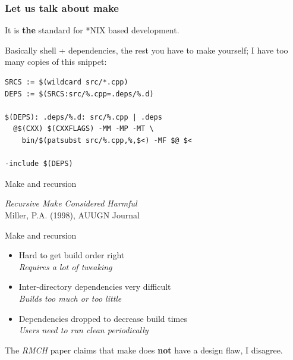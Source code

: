\documentclass[11pt]{beamer}
\begin{document}
\begin{frame}[fragile]
  \frametitle{Let us talk about make}

  It is \alert{\textbf{the}} standard for *NIX based development.

  \vspace{3mm}

  Basically shell + dependencies, the rest you have to make yourself;
  I have too many copies of this snippet:

  \vspace{5mm}

  \begin{lstlisting}[language={[gnu]make}]
SRCS := $(wildcard src/*.cpp)
DEPS := $(SRCS:src/%.cpp=.deps/%.d)

$(DEPS): .deps/%.d: src/%.cpp | .deps
  @$(CXX) $(CXXFLAGS) -MM -MP -MT \
    bin/$(patsubst src/%.cpp,%,$<) -MF $@ $<

-include $(DEPS)
  \end{lstlisting}


\end{frame}

\begin{frame}{Make and recursion}

  \begin{center}
    {\Large\textit{Recursive Make Considered Harmful}} \\
    Miller, P.A. (1998), AUUGN Journal
  \end{center}

\end{frame}

\begin{frame}{Make and recursion}

  \begin{itemize}
    \item Hard to get build order right \\
      \emph{Requires a lot of tweaking}
    \item Inter-directory dependencies very difficult \\
      \emph{Builds too much or too little}
    \item Dependencies dropped to decrease build times \\
      \emph{Users need to run clean periodically}
  \end{itemize}

  The \emph{RMCH} paper claims that make does \textbf{\alert{not}} have a design
  flaw, I disagree.

\end{frame}
\end{document}
